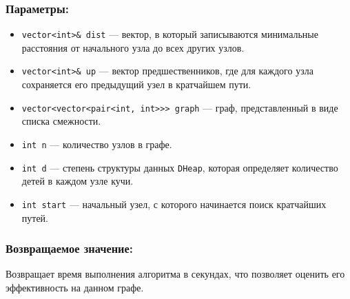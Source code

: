 \subsubsection*{Параметры:}
\begin{itemize}
    \item \texttt{vector<int>\& dist} — вектор, в который записываются минимальные расстояния от начального узла до всех других узлов.
    \item \texttt{vector<int>\& up} — вектор предшественников, где для каждого узла сохраняется его предыдущий узел в кратчайшем пути.
    \item \texttt{vector<vector<pair<int, int>>> graph} — граф, представленный в виде списка смежности.
    \item \texttt{int n} — количество узлов в графе.
    \item \texttt{int d} — степень структуры данных \texttt{DHeap}, которая определяет количество детей в каждом узле кучи.
    \item \texttt{int start} — начальный узел, с которого начинается поиск кратчайших путей.
\end{itemize}

\subsubsection*{Возвращаемое значение:}
Возвращает время выполнения алгоритма в секундах, что позволяет оценить его эффективность на данном графе.

